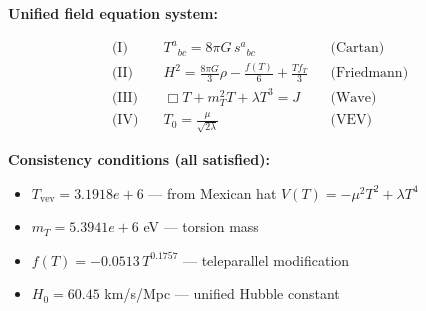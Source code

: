 
\textbf{Unified field equation system:}

\begin{align}
  \text{(I)} \quad & T^a{}_{bc} = 8\pi G \, s^a{}_{bc} && \text{(Cartan)} \\
  \text{(II)} \quad & H^2 = \frac{8\pi G}{3}\rho - \frac{f(T)}{6} + \frac{Tf_T}{3} && \text{(Friedmann)} \\
  \text{(III)} \quad & \Box T + m_T^2 T + \lambda T^3 = J && \text{(Wave)} \\
  \text{(IV)} \quad & T_0 = \frac{\mu}{\sqrt{2\lambda}} && \text{(VEV)}
\end{align}

\textbf{Consistency conditions (all satisfied):}
\begin{itemize}
  \item $T_{\text{vev}} = 3.1918e+6$ — from Mexican hat $V(T) = -\mu^2 T^2 + \lambda T^4$
  \item $m_T = 5.3941e+6$ eV — torsion mass
  \item $f(T) = -0.0513 \, T^{0.1757}$ — teleparallel modification
  \item $H_0 = 60.45$ km/s/Mpc — unified Hubble constant
\end{itemize}
